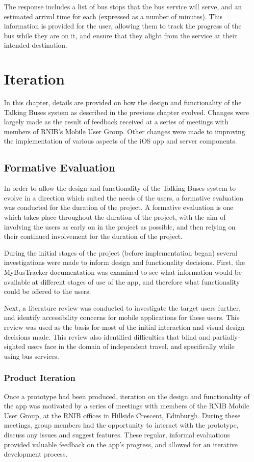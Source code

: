 \documentclass[10pt,twocolumn]{article}
\newcommand{\citep}[1]{}
\begin{document}
The response includes a list of bus stops that the bus service will serve, and an estimated arrival time for each (expressed as a number of minutes). This information is provided for the user, allowing them to track the progress of the bus while they are on it, and ensure that they alight from the service at their intended destination.


\section{Iteration}
In this chapter, details are provided on how the design and functionality of the Talking Buses system as described in the previous chapter evolved. Changes were largely made as the result of feedback received at a series of meetings with members of RNIB's Mobile User Group. Other changes were made to improving the implementation of various aspects of the iOS app and server components.

\subsection{Formative Evaluation}
In order to allow the design and functionality of the Talking Buses system to evolve in a direction which suited the needs of the users, a formative evaluation was conducted for the duration of the project. A formative evaluation is one which takes place throughout the duration of the project, with the aim of involving the users as early on in the project as possible, and then relying on their continued involvement for the duration of the project\citep{formativeEval}.

During the initial stages of the project (before implementation began) several investigations were made to inform design and functionality decisions. First, the MyBusTracker documentation was examined to see what information would be available at different stages of use of the app, and therefore what functionality could be offered to the users.

Next, a literature review was conducted to investigate the target users further, and identify accessibility concerns for mobile applications for these users. This review was used as the basis for most of the initial interaction and visual design decisions made. This review also identified difficulties that blind and partially-sighted users face in the domain of independent travel, and specifically while using bus services.

\subsubsection{Product Iteration}
Once a prototype had been produced, iteration on the design and functionality of the app was motivated by a series of meetings with members of the RNIB Mobile User Group, at the RNIB offices in Hillside Crescent, Edinburgh. During these meetings, group members had the opportunity to interact with the prototype, discuss any issues and suggest features.  These regular, informal evaluations provided valuable feedback on the app's progress, and allowed for an iterative development process.
\end{document}
